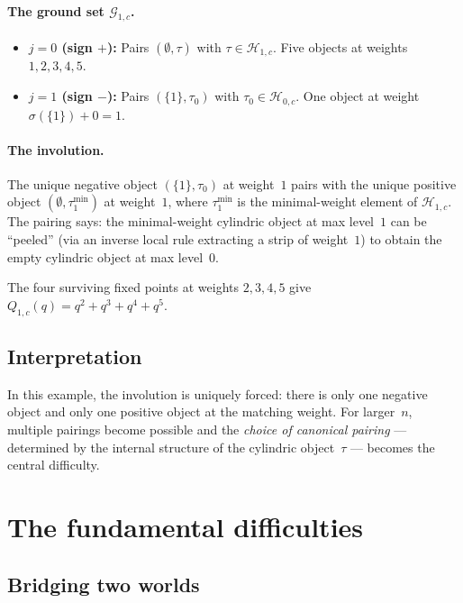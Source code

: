 \documentclass[11pt]{article}
\theoremstyle{plain}
\theoremstyle{definition}
\begin{document}
\paragraph{The ground set $\mathcal{G}_{1,c}$.}
\begin{itemize}
  \item \textbf{$j = 0$ (sign $+$):}
    Pairs $(\emptyset, \tau)$ with $\tau \in \mathcal{H}_{1,c}$.
    Five objects at weights $1, 2, 3, 4, 5$.
  \item \textbf{$j = 1$ (sign $-$):}
    Pairs $(\{1\}, \tau_0)$ with $\tau_0 \in \mathcal{H}_{0,c}$.
    One object at weight $\sigma(\{1\}) + 0 = 1$.
\end{itemize}

\paragraph{The involution.}
The unique negative object $(\{1\}, \tau_0)$ at weight~$1$
pairs with the unique positive object $(\emptyset, \tau_1^{\min})$
at weight~$1$, where $\tau_1^{\min}$ is the minimal-weight
element of $\mathcal{H}_{1,c}$.  The pairing says: the
minimal-weight cylindric object at max level~$1$ can be
``peeled'' (via an inverse local rule extracting a strip of
weight~$1$) to obtain the empty cylindric object at max level~$0$.

The four surviving fixed points at weights $2, 3, 4, 5$ give
$Q_{1,c}(q) = q^2 + q^3 + q^4 + q^5$.

\subsection{Interpretation}

In this example, the involution is uniquely forced: there is only
one negative object and only one positive object at the matching
weight.  For larger~$n$, multiple pairings become possible and the
\emph{choice of canonical pairing} --- determined by the internal
structure of the cylindric object~$\tau$ --- becomes the central
difficulty.


\section{The fundamental difficulties}
\label{sec:difficulties}

\subsection{Bridging two worlds}
\end{document}
